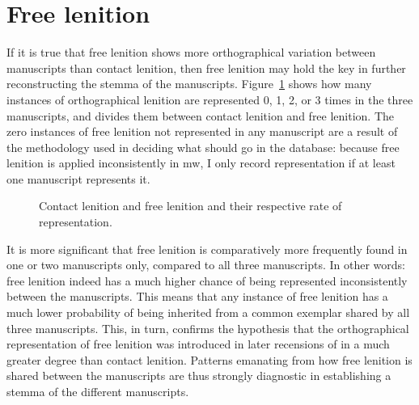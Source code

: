 \section{Free lenition}
\label{sec:points-where-one}
If it is true that free lenition shows more orthographical variation between manuscripts than contact lenition, then free lenition may hold the key in further reconstructing the stemma of the manuscripts. Figure~\ref{fig:contfreelendewi} shows how many instances of orthographical lenition are represented 0, 1, 2, or 3 times in the three manuscripts, and divides them between contact lenition and free lenition. The zero instances of free lenition not represented in any manuscript are a result of the methodology used in deciding what should go in the database: because free lenition is applied inconsistently in \gls{mw}, I only record representation if at least one manuscript represents it.

\begin{figure}[h]
  \centering
  \caption{Contact lenition and free lenition and their respective rate of representation.}
  \label{fig:contfreelendewi}
\end{figure}

%   

It is more significant that free lenition is comparatively more frequently found in one or two manuscripts only, compared to all three manuscripts. In other words: free lenition indeed has a much higher chance of being represented inconsistently between the manuscripts. This means that any instance of free lenition has a much lower probability of being inherited from a common exemplar shared by all three manuscripts. This, in turn, confirms the hypothesis that the orthographical representation of free lenition was introduced in later recensions of  in a much greater degree than contact lenition. Patterns  emanating from how free lenition is shared between the manuscripts are thus strongly diagnostic in establishing a stemma of the different manuscripts.

